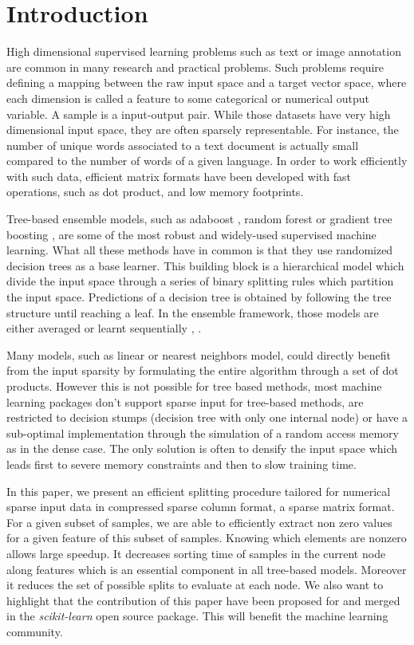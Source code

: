 \section{Introduction}

High dimensional supervised learning problems such as text or image
annotation are common in many research and practical problems. Such
problems require defining a mapping between the raw input space and a
target vector space, where each dimension is called a feature to some
categorical or numerical output variable.  A sample is a input-output
pair. While those datasets have very high dimensional input space,
they are often sparsely representable. For instance, the number of
unique words associated to a text document is actually small compared
to the number of words of a given language. In order to work
efficiently with such data, efficient matrix formats have been
developed with fast operations, such as dot product, and low memory
footprints.

Tree-based ensemble models, such as adaboost \cite{freund1995desicion}, random
forest \cite{breiman2001random} or gradient tree boosting
\cite{friedman2001greedy}, are some of the most robust and widely-used
supervised machine learning. What all these methods have in common is that they use
randomized decision trees as a base learner. This building block is a
hierarchical model which divide the input space through a series of binary
splitting rules which partition the input space. Predictions of a decision tree is obtained by
following the tree structure until reaching a leaf. In the ensemble framework, those models are either averaged
\cite{breiman2001random} or learnt sequentially \cite{freund1995desicion},
\cite{friedman2001greedy}.

Many models, such as linear or nearest neighbors model, could directly benefit
from the input sparsity by formulating the entire algorithm through a set of
dot products. However this is not possible for tree based methods, most machine
learning packages don't support sparse input for tree-based methods, are
restricted to decision stumps (decision tree with only one internal node) or
have a sub-optimal implementation through the simulation of a random access
memory as in the dense case. The only solution is often to densify the input
space which leads first to severe memory constraints and then to slow
training time.

In this paper, we present an efficient splitting procedure tailored for
numerical sparse input data in compressed sparse column format, a sparse matrix
format. For a given subset of samples, we are able to efficiently extract non
zero values for a given feature of this subset of samples. Knowing which
elements are nonzero allows large speedup. It decreases sorting time of
samples in the current node along features which is an essential component in
all tree-based models. Moreover it reduces the set of possible splits to
evaluate at each node. We also want to highlight that the contribution of this
paper have been proposed for and merged in the  \emph{scikit-learn}
\cite{buitinck2013api,pedregosa2011scikit} open source package. This will
benefit the machine learning community.

